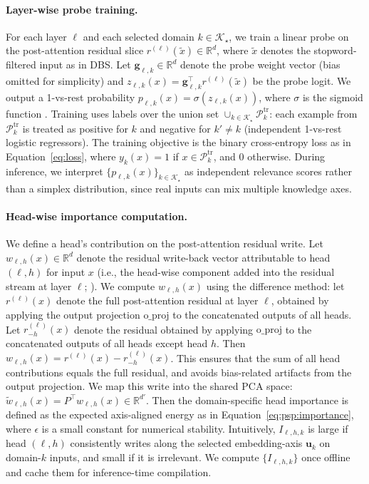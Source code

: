 \paragraph{Layer-wise probe training.}
For each layer $\ell$ and each selected domain $k \in \mathcal{K}_\star$, we train a linear probe on the post-attention residual slice $r^{(\ell)}(\tilde{x}) \in \mathbb{R}^d$, where $\tilde{x}$ denotes the stopword-filtered input as in DBS.
Let $\mathbf{g}_{\ell,k} \in \mathbb{R}^d$ denote the probe weight vector (bias omitted for simplicity) and $z_{\ell,k}(x) = \mathbf{g}_{\ell,k}^\top r^{(\ell)}(\tilde{x})$ be the probe logit.
We output a 1-vs-rest probability $p_{\ell,k}(x) = \sigma(z_{\ell,k}(x))$, where $\sigma$ is the sigmoid function \cite{alain2016linearprobes,belinkov2022probing}.
Training uses labels over the union set $\cup_{k\in\mathcal{K}_\star} \mathcal{P}_k^{\mathrm{tr}}$: each example from $\mathcal{P}_k^{\mathrm{tr}}$ is treated as positive for $k$ and negative for $k' \neq k$ (independent 1-vs-rest logistic regressors).
The training objective is the binary cross-entropy loss as in Equation~\eqref{eq:loss}, where $y_k(x) = 1$ if $x \in \mathcal{P}_k^{\mathrm{tr}}$, and $0$ otherwise.
During inference, we interpret $\{p_{\ell,k}(x)\}_{k\in\mathcal{K}_\star}$ as independent relevance scores rather than a simplex distribution, since real inputs can mix multiple knowledge axes.

\paragraph{Head-wise importance computation.}
We define a head's contribution on the post-attention residual write.
Let $w_{\ell,h}(x) \in \mathbb{R}^d$ denote the residual write-back vector attributable to head $(\ell,h)$ for input $x$ (i.e., the head-wise component added into the residual stream at layer $\ell$; \citealp{elhage2021framework}).
We compute $w_{\ell,h}(x)$ using the difference method: let $r^{(\ell)}(x)$ denote the full post-attention residual at layer $\ell$, obtained by applying the output projection $\text{o\_proj}$ to the concatenated outputs of all heads.
Let $r^{(\ell)}_{-h}(x)$ denote the residual obtained by applying $\text{o\_proj}$ to the concatenated outputs of all heads except head $h$.
Then $w_{\ell,h}(x) = r^{(\ell)}(x) - r^{(\ell)}_{-h}(x)$.
This ensures that the sum of all head contributions equals the full residual, and avoids bias-related artifacts from the output projection.
We map this write into the shared PCA space: $\tilde{w}_{\ell,h}(x) = P^\top w_{\ell,h}(x) \in \mathbb{R}^{d'}$.
Then the domain-specific head importance is defined as the expected axis-aligned energy as in Equation~\eqref{eq:psp:importance}, where $\epsilon$ is a small constant for numerical stability.
Intuitively, $I_{\ell,h,k}$ is large if head $(\ell,h)$ consistently writes along the selected embedding-axis $\mathbf{u}_k$ on domain-$k$ inputs, and small if it is irrelevant.
We compute $\{I_{\ell,h,k}\}$ once offline and cache them for inference-time compilation.

